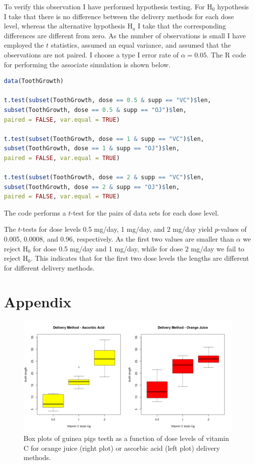 \documentclass[a4paper,12pt]{article}
\begin{document}
To verify this observation I have performed hypothesis testing. For H$_0$ hypothesis I take that there is no difference between the delivery methods for each dose level, whereas the alternative hypothesis H$_a$ I take that the corresponding differences are different from zero. As the number of observations is small I have employed the $t$ statistics, assumed an equal variance, and assumed that the observations are not paired. I choose a type I error rate of $\alpha=0.05$. The R code for performing the associate simulation is shown below.
\footnotesize
\begin{lstlisting}[backgroundcolor = \color{lightgray}, language=R]
data(ToothGrowth)

t.test(subset(ToothGrowth, dose == 0.5 & supp == "VC")$len, 
subset(ToothGrowth, dose == 0.5 & supp == "OJ")$len, 
paired = FALSE, var.equal = TRUE)

t.test(subset(ToothGrowth, dose == 1 & supp == "VC")$len, 
subset(ToothGrowth, dose == 1 & supp == "OJ")$len, 
paired = FALSE, var.equal = TRUE)

t.test(subset(ToothGrowth, dose == 2 & supp == "VC")$len, 
subset(ToothGrowth, dose == 2 & supp == "OJ")$len, 
paired = FALSE, var.equal = TRUE)

\end{lstlisting}
\normalsize
The code performs a $t$-test for the pairs of data sets for each dose level.

The $t$-tests for dose levels 0.5 mg/day, 1 mg/day, and 2 mg/day yield $p$-values of 0.005,  0.0008, and 0.96, respectively. As the first two values are smaller than $\alpha$ we reject H$_0$  for dose 0.5 mg/day and 1 mg/day, while for dose 2 mg/day we fail to reject H$_0$. This indicates that for the first two dose levels the lengths are different for different delivery methods.

\newpage
\section{Appendix}


\begin{figure}[!h]
\centering
\includegraphics[width=13 cm]{Toothgrowth2.png}
\caption{ \label{fig:Tooth1}
Box plots of guinea pigs teeth as a function of dose levels of vitamin C  for orange juice (right plot) or ascorbic acid (left plot) delivery methods.}
\end{figure}
\end{document}
